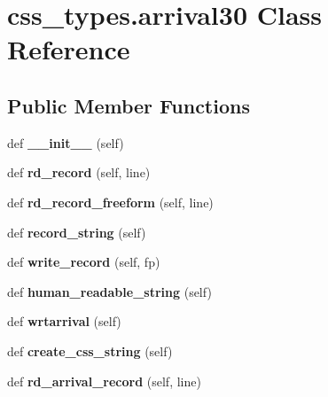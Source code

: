 \hypertarget{classcss__types_1_1arrival30}{}\section{css\+\_\+types.\+arrival30 Class Reference}
\label{classcss__types_1_1arrival30}
\subsection*{Public Member Functions}
\begin{DoxyCompactItemize}
\item 
\hypertarget{classcss__types_1_1arrival30_a8cff4aaf1f35df57a833e2cf12c9eb8d}{}def {\bfseries \+\_\+\+\_\+init\+\_\+\+\_\+} (self)\label{classcss__types_1_1arrival30_a8cff4aaf1f35df57a833e2cf12c9eb8d}

\item 
\hypertarget{classcss__types_1_1arrival30_a98a29dc3b1d8ef252d864b082366a76a}{}def {\bfseries rd\+\_\+record} (self, line)\label{classcss__types_1_1arrival30_a98a29dc3b1d8ef252d864b082366a76a}

\item 
\hypertarget{classcss__types_1_1arrival30_a3e844c971e89e4b8826001b691ee0a66}{}def {\bfseries rd\+\_\+record\+\_\+freeform} (self, line)\label{classcss__types_1_1arrival30_a3e844c971e89e4b8826001b691ee0a66}

\item 
\hypertarget{classcss__types_1_1arrival30_ac1ee0633b09d81c75c562335211454bf}{}def {\bfseries record\+\_\+string} (self)\label{classcss__types_1_1arrival30_ac1ee0633b09d81c75c562335211454bf}

\item 
\hypertarget{classcss__types_1_1arrival30_a6a5082085d1197cb54b83564bd746e2e}{}def {\bfseries write\+\_\+record} (self, fp)\label{classcss__types_1_1arrival30_a6a5082085d1197cb54b83564bd746e2e}

\item 
\hypertarget{classcss__types_1_1arrival30_acc68dff4ea7bc718926469e2ffd1815a}{}def {\bfseries human\+\_\+readable\+\_\+string} (self)\label{classcss__types_1_1arrival30_acc68dff4ea7bc718926469e2ffd1815a}

\item 
\hypertarget{classcss__types_1_1arrival30_a63a7071321d798636fa2fb680cc58e2c}{}def {\bfseries wrtarrival} (self)\label{classcss__types_1_1arrival30_a63a7071321d798636fa2fb680cc58e2c}

\item 
\hypertarget{classcss__types_1_1arrival30_ad9033b6b677c4de0327f49494b996942}{}def {\bfseries create\+\_\+css\+\_\+string} (self)\label{classcss__types_1_1arrival30_ad9033b6b677c4de0327f49494b996942}

\item 
\hypertarget{classcss__types_1_1arrival30_a1b6d7d9013fe21af7e9b230ec5c246f1}{}def {\bfseries rd\+\_\+arrival\+\_\+record} (self, line)\label{classcss__types_1_1arrival30_a1b6d7d9013fe21af7e9b230ec5c246f1}

\end{DoxyCompactItemize}
